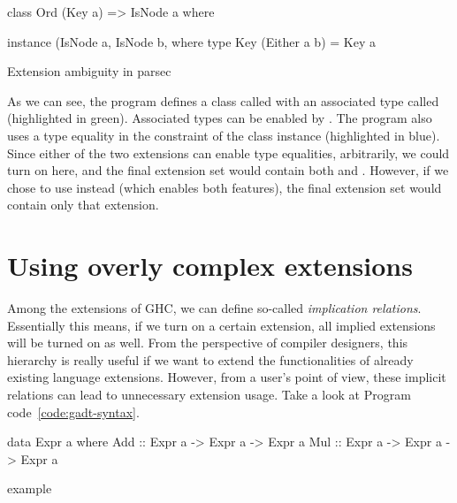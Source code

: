 \documentclass[main.tex]{subfiles}
\begin{document}
	\begin{codeFloat}
		\begin{haskell}
			class Ord (Key a) => IsNode a where
			
			instance (IsNode a, IsNode b, %
			  where type Key (Either a b) = Key a
		\end{haskell}
		\caption{Extension ambiguity in parsec}
		\label{code:ext-ambiguity-parsec}
	\end{codeFloat}
	
	As we can see, the program defines a class called  with an associated type called  (highlighted in green). Associated types can be enabled by . The program	also uses a type equality in the constraint of the  class instance (highlighted in blue). Since either of the two extensions can enable type equalities, arbitrarily, we could turn on  here, and the final extension set would contain both  and . However, if we chose to use  instead (which enables both features), the final extension set would contain only that extension.
	
	
	\section{Using overly complex extensions}
	
	Among the extensions of GHC, we can define so-called \emph{implication relations}. Essentially this means, if we turn on a certain extension, all implied extensions will be turned on as well. From the perspective of compiler designers, this hierarchy is really useful if we want to extend the functionalities of already existing language extensions. However, from a user's point of view, these implicit relations can lead to unnecessary extension usage. Take a look at Program code~\ref{code:gadt-syntax}.
	
	\begin{codeFloat}[H]
		\begin{haskell}
    data Expr a where
      Add :: Expr a -> Expr a -> Expr a
      Mul :: Expr a -> Expr a -> Expr a
		\end{haskell}
		\caption{ example}
		\label{code:gadt-syntax}
	\end{codeFloat}
	
\end{document}
